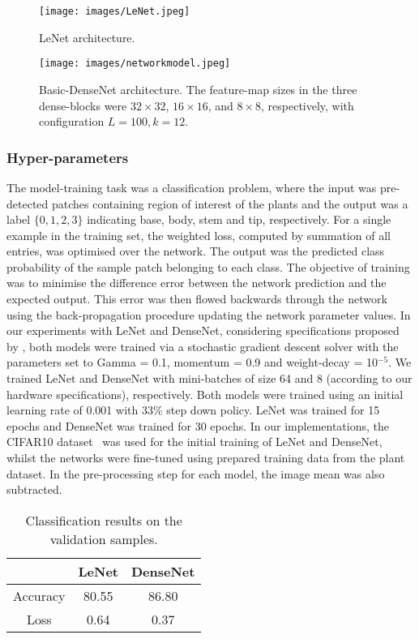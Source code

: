 \documentclass[a4paper,num-refs]{oup-contemporary}
\begin{document}
\begin{figure*}[!ht]
\centering
\texttt{[image: images/LeNet.jpeg]}
\caption{LeNet architecture.}
\label{model1}
\end{figure*} 
\begin{figure*}[!ht]
\centering
\texttt{[image: images/networkmodel.jpeg]}
\caption{Basic-DenseNet architecture. The feature-map sizes  in  the  three  dense-blocks  were  $32\times32$,  $16\times16$,  and $8\times8$, respectively,  with  configuration $L=100, k=12$.}
\label{model2}
\end{figure*} 

\subsubsection{Hyper-parameters}
The model-training task was a classification problem, where the input was pre-detected patches containing region of interest of the plants and the output was a label $\{0, 1, 2, 3\}$ indicating base, body, stem and tip, respectively. For a single example in the training set, the weighted loss, computed by summation of all entries, was optimised over the network. The  output was the predicted class probability of the sample patch belonging to each class. The objective of training was to minimise the difference  error  between the  network  prediction and the expected output. This error  was then flowed backwards through the network using the back-propagation  procedure \cite{lecun2015deep}   updating the network parameter values. 
In our experiments with LeNet and DenseNet, considering specifications proposed by \citet{huang2017densely}, both models were trained via a stochastic gradient descent solver with the parameters set to Gamma = 0.1,  momentum = 0.9 and weight-decay = 10$^{-5}$. We trained LeNet and DenseNet with mini-batches of size 64 and 8 (according to our hardware specifications), respectively. Both models were trained using an initial learning rate of 0.001 with 33\% step down policy. LeNet was trained for 15 epochs and DenseNet was trained for 30 epochs. In our implementations, the CIFAR10 dataset~\cite{krizhevsky2009learning} was used for the initial training of  LeNet and  DenseNet, whilst the networks were fine-tuned using prepared training data from the plant dataset.  In the pre-processing step for each model, the image mean was also subtracted. 

\begin{table}
	\centering
	\caption{Classification results on the validation samples.}
	\begin{tabular}{c c c }
		\hline
		 & LeNet & DenseNet \\ [0.5ex] 
		\hline
		Accuracy & 80.55 & 86.80  \\ 
		Loss & 0.64 & 0.37 \\
		\hline
	\end{tabular}
	\label{tr}
\end{table}
\end{document}
